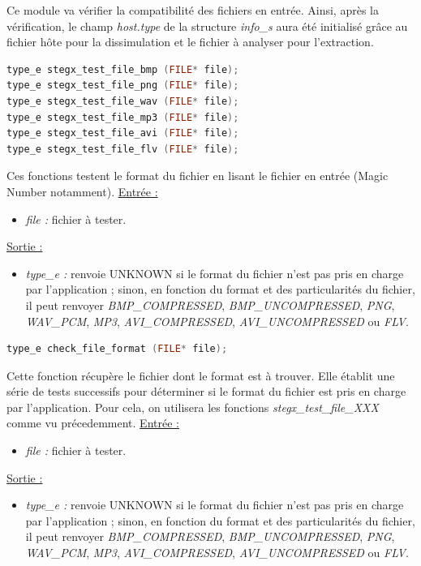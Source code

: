 \documentclass[11pt]{article}
\begin{document}
Ce module va  vérifier la compatibilité des fichiers en entrée. 
Ainsi, après la vérification, le champ \textit{host.type} de la structure 
\textit{info\_s} aura été initialisé grâce au fichier hôte pour la dissimulation 
et le fichier à analyser pour l'extraction.  
\newline

\begin{lstlisting}[language=c]
type_e stegx_test_file_bmp (FILE* file);
type_e stegx_test_file_png (FILE* file);
type_e stegx_test_file_wav (FILE* file);
type_e stegx_test_file_mp3 (FILE* file);
type_e stegx_test_file_avi (FILE* file);
type_e stegx_test_file_flv (FILE* file);
\end{lstlisting}

Ces fonctions testent le format du fichier en lisant le fichier en entrée 
(Magic Number notamment). 
\newline
\underline{Entrée :} 
\begin{itemize}
\item \textit{file :} fichier à tester. 
\end{itemize}
\underline{Sortie :} 
\begin{itemize}
\item \textit{type\_e :} renvoie UNKNOWN si le format du fichier n'est pas pris en 
charge par l'application ; sinon, en fonction du format et des particularités 
du fichier, il peut renvoyer \textit{BMP\_COMPRESSED}, \textit{BMP\_UNCOMPRESSED}, 
\textit{PNG}, \textit{WAV\_PCM}, \textit{MP3}, \textit{AVI\_COMPRESSED}, 
\textit{AVI\_UNCOMPRESSED} ou \textit{FLV}. 
\newline 
\end{itemize}

\begin{lstlisting}[language=c]
type_e check_file_format (FILE* file);
\end{lstlisting}

Cette fonction récupère le fichier dont le format est à trouver. Elle établit une 
série de tests successifs pour déterminer si le format du fichier est pris en charge 
par l'application. 
Pour cela, on utilisera les fonctions \textit{stegx\_test\_file\_XXX} 
comme vu précedemment. 
\newline
\underline{Entrée :} 
\begin{itemize}
\item \textit{file :} fichier à tester. 
\end{itemize}
\underline{Sortie :} 
\begin{itemize}
\item \textit{type\_e :} renvoie UNKNOWN si le format du fichier n'est pas pris en 
charge par l'application ; sinon, en fonction du format et des particularités 
du fichier, il peut renvoyer \textit{BMP\_COMPRESSED}, \textit{BMP\_UNCOMPRESSED}, 
\textit{PNG}, \textit{WAV\_PCM}, \textit{MP3}, \textit{AVI\_COMPRESSED}, 
\textit{AVI\_UNCOMPRESSED} ou \textit{FLV}. 
\newline 
\end{itemize}
\end{document}
